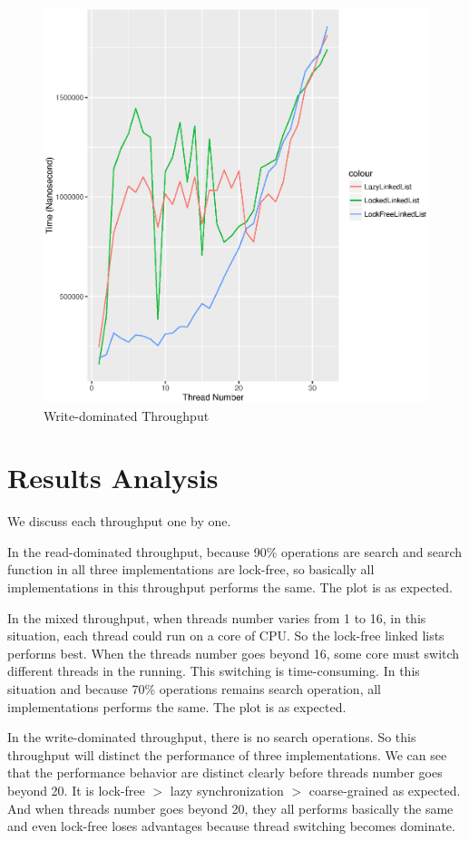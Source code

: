 \documentclass[a4paper]{report}
\begin{document}
\begin{figure}[H]
  \includegraphics[scale=0.8]{result/result-tacc-7796986-write}
  \caption{Write-dominated Throughput}
\end{figure}

\section*{Results Analysis}
We discuss each throughput one by one.

In the read-dominated throughput, because 90\% operations are search and search function in all three implementations are lock-free, so basically all implementations in this throughput performs the same. The plot is as expected.

In the mixed throughput, when threads number varies from 1 to 16, in this situation, each thread could run on a core of CPU. So the lock-free linked lists performs best. When the threads number goes beyond 16, some core must switch different threads in the running. This switching is time-consuming. In this situation and because 70\% operations remains search operation, all implementations performs the same. The plot is as expected.

In the write-dominated throughput, there is no search operations. So this throughput will distinct the performance of three implementations. We can see that the performance behavior are distinct clearly before threads number goes beyond 20. It is lock-free $>$ lazy synchronization $>$ coarse-grained as expected. And when threads number goes beyond 20, they all performs basically the same and even lock-free loses advantages because thread switching becomes dominate.
\end{document}
